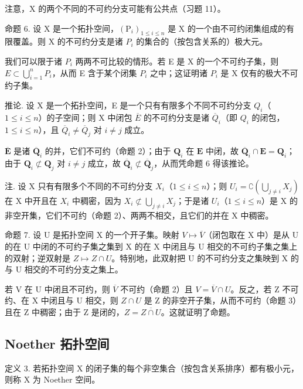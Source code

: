 注意，X 的两个不同的不可约分支可能有公共点（习题 11）。

命题 6. 设 X 是一个拓扑空间，\((\mathrm{P}_{i})_{1\leq i\leq n}\) 是 X 的一个由不可约闭集组成的有限覆盖。则 X 的不可约分支是诸 \(P_{i}\) 的集合的（按包含关系的）极大元。

我们可以限于诸 \(P_{i}\) 两两不可比较的情形。若 E 是 X 的一个不可约子集，则 \(E \subset \bigcup_{i=1}^{n} P_{i}\)，从而 E 含于某个闭集 \(P_{i}\) 之中；这证明诸 \(P_{i}\) 是 X 仅有的极大不可约子集。

推论. 设 X 是一个拓扑空间，E 是一个只有有限多个不同不可约分支 \(Q_{i}\)（\(1 \leqslant i \leqslant n\)）的子空间；则 X 中闭包 \(\overline{E}\) 的不可约分支是诸 \(\overline{Q}_{i}\)（即 \(Q_{i}\) 的闭包，\(1 \leqslant i \leqslant n\)），且 \(\overline{Q}_{i} \neq \overline{Q}_{j}\) 对 \(i \neq j\) 成立。

\(\overline{\mathbf{E}}\) 是诸 \(\overline{\mathbf{Q}}_i\) 的并，它们不可约（命题 2）；由于 \(\mathbf{Q}_i\) 在 \(\mathbf{E}\) 中闭，故 \(\overline{\mathbf{Q}}_i \cap \mathbf{E} = \mathbf{Q}_i\)；由于 \(\mathbf{Q}_i \not\subset \mathbf{Q}_j\) 对 \(i \neq j\) 成立，故 \(\overline{\mathbf{Q}}_i \not\subset \overline{\mathbf{Q}}_j\)，从而凭命题 6 得该推论。

注. 设 X 只有有限多个不同的不可约分支 \(X_{i}\)（\(1 \leqslant i \leqslant n\)）；则 \(U_{i} = \complement\left(\bigcup_{j \neq i} X_{j}\right)\) 在 X 中开且在 \(X_{i}\) 中稠密，因为 \(X_{i} \not\subset \bigcup_{j \neq i} X_{j}\)；于是诸 \(U_{i}\)（\(1 \leqslant i \leqslant n\)）是 X 的非空开集，它们不可约（命题 2）、两两不相交，且它们的并在 X 中稠密。

命题 7. 设 U 是拓扑空间 X 的一个开子集。映射 \(V \mapsto \overline{V}\)（闭包取在 X 中）是从 U 的在 U 中闭的不可约子集之集到 X 的在 X 中闭且与 U 相交的不可约子集之集上的双射；逆双射是 \(Z \mapsto Z \cap U\)。特别地，此双射把 U 的不可约分支之集映到 X 的与 U 相交的不可约分支之集上。

若 V 在 U 中闭且不可约，则 \(\overline{V}\) 不可约（命题 2）且 \(V = \overline{V} \cap U\)。反之，若 Z 不可约、在 X 中闭且与 U 相交，则 \(Z \cap U\) 是 Z 的非空开子集，从而不可约（命题 3）且在 Z 中稠密；由于 Z 是闭的，\(Z = \overline{Z \cap U}\)。这就证明了命题。

\subsection{Noether 拓扑空间}

定义 3. 若拓扑空间 X 的闭子集的每个非空集合（按包含关系排序）都有极小元，则称 X 为 Noether 空间。

